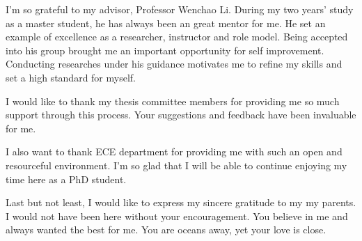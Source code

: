 I'm so grateful to my advisor, Professor Wenchao Li.
During my two years' study as a master student, he has always been an great mentor for me. 
He set an example of excellence as a researcher, instructor and role model.
Being accepted into his group brought me an important opportunity for self improvement.
Conducting researches under his guidance motivates me to refine my skills and set a high standard for myself. 

I would like to thank my thesis committee members for providing me so much support through this process. 
Your suggestions and feedback have been invaluable for me.

I also want to thank ECE department for providing me with such an open and resourceful environment. 
I'm so glad that I will be able to continue enjoying my time here as a PhD student.

Last but not least, I would like to express my sincere gratitude to my my parents. 
I would not have been here without your encouragement. You believe in me and always wanted the best for me.
You are oceans away, yet your love is close.

\vskip 1in
